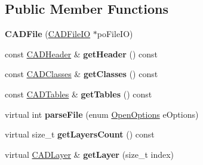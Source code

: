 \subsection*{Public Member Functions}
\begin{DoxyCompactItemize}
\item 
{\bfseries C\+A\+D\+File} (\hyperlink{class_c_a_d_file_i_o}{C\+A\+D\+File\+IO} $\ast$po\+File\+IO)\hypertarget{class_c_a_d_file_a29cf9e51220c9bd2242067f065fefa12}{}\label{class_c_a_d_file_a29cf9e51220c9bd2242067f065fefa12}

\item 
const \hyperlink{class_c_a_d_header}{C\+A\+D\+Header} \& {\bfseries get\+Header} () const \hypertarget{class_c_a_d_file_a7fd02ff6859073889ddc1f48ef231fb5}{}\label{class_c_a_d_file_a7fd02ff6859073889ddc1f48ef231fb5}

\item 
const \hyperlink{class_c_a_d_classes}{C\+A\+D\+Classes} \& {\bfseries get\+Classes} () const \hypertarget{class_c_a_d_file_a38f0e7d2f11f31be149a1d6f67e1dac7}{}\label{class_c_a_d_file_a38f0e7d2f11f31be149a1d6f67e1dac7}

\item 
const \hyperlink{class_c_a_d_tables}{C\+A\+D\+Tables} \& {\bfseries get\+Tables} () const \hypertarget{class_c_a_d_file_a950a209c6a096013fd7bdb61d22764d3}{}\label{class_c_a_d_file_a950a209c6a096013fd7bdb61d22764d3}

\item 
virtual int {\bfseries parse\+File} (enum \hyperlink{class_c_a_d_file_a4776c7f9fc5888cac0ee6eede900db5a}{Open\+Options} e\+Options)\hypertarget{class_c_a_d_file_a591e193ee4fceda0f48811ca9e94858d}{}\label{class_c_a_d_file_a591e193ee4fceda0f48811ca9e94858d}

\item 
virtual size\+\_\+t {\bfseries get\+Layers\+Count} () const \hypertarget{class_c_a_d_file_a68b5053784e3ea7956abec99ed51727d}{}\label{class_c_a_d_file_a68b5053784e3ea7956abec99ed51727d}

\item 
virtual \hyperlink{class_c_a_d_layer}{C\+A\+D\+Layer} \& {\bfseries get\+Layer} (size\+\_\+t index)\hypertarget{class_c_a_d_file_a44f461c84fcd6afb4e9a3e76815a0e31}{}\label{class_c_a_d_file_a44f461c84fcd6afb4e9a3e76815a0e31}

\end{DoxyCompactItemize}
